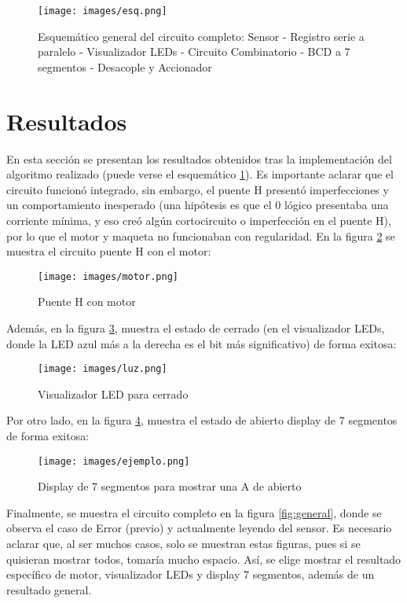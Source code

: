 \documentclass[conference]{IEEEtran}  %
\begin{document}
\begin{figure}[h!] %
    \centering    
    \texttt{[image: images/esq.png]} %
    \caption{Esquemático general del circuito completo: Sensor - Registro serie a paralelo - Visualizador LEDs - Circuito Combinatorio - BCD a 7 segmentos - Desacople y Accionador}
    \label{fig:esq}
\end{figure}

\section{Resultados}

En esta sección se presentan los resultados obtenidos tras la implementación del algoritmo realizado (puede verse el esquemático \ref{fig:esq}). Es importante aclarar que el circuito funcionó integrado, sin embargo, el puente H presentó imperfecciones y un comportamiento inesperado (una hipótesis es que el 0 lógico presentaba una corriente mínima, y eso creó algún cortocircuito o imperfección en el puente H), por lo que el motor y maqueta no funcionaban con regularidad. En la figura \ref{fig:motor} se muestra el circuito puente H con el motor:

\begin{figure}[h]
    \centering
    \texttt{[image: images/motor.png]}
    \caption{Puente H con motor}
    \label{fig:motor}
\end{figure}

Además, en la figura \ref{fig:luz}, muestra el estado de cerrado (en el visualizador LEDs, donde la LED azul más a la derecha es el bit más significativo) de forma exitosa:

\begin{figure}[h]
    \centering
    \texttt{[image: images/luz.png]}
    \caption{Visualizador LED para cerrado}
    \label{fig:luz}
\end{figure}

Por otro lado, en la figura \ref{fig:ejemplo}, muestra el estado de abierto display de 7 segmentos de forma exitosa:

\begin{figure}[h]
    \centering
    \texttt{[image: images/ejemplo.png]}
    \caption{Display de 7 segmentos para mostrar una A de abierto}
    \label{fig:ejemplo}
\end{figure}

Finalmente, se muestra el circuito completo en la figura \ref{fig:general}, donde se observa el caso de Error (previo) y actualmente leyendo del sensor. Es necesario aclarar que, al ser muchos casos, solo se muestran estas figuras, pues si se quisieran mostrar todos, tomaría mucho espacio. Así, se elige mostrar el resultado específico de motor, visualizador LEDs y display 7 segmentos, además de un resultado general.
\end{document}
